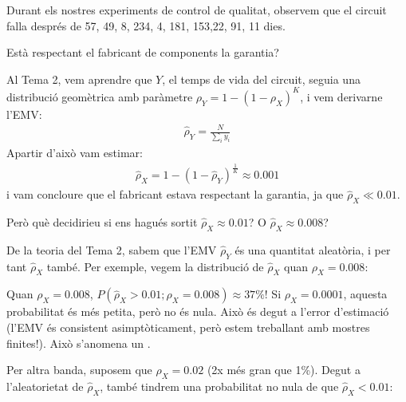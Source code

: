 \documentclass[letterpaper,10pt,english]{sphinxmanual}
\let\sphinxpxdimen\pdfpxdimen\else\newdimen\sphinxpxdimen
\begin{document}
Durant els nostres experiments de control de qualitat, observem
que el circuit falla després  de 57, 49, 8, 234, 4, 181, 153,22,  91,  11 dies.

Està respectant el fabricant de components la garantia?

Al Tema 2, vem aprendre que \(Y\), el temps de vida del circuit,
seguia una distribució geomètrica amb paràmetre \(\rho_Y = 1 - (1-\rho_X)^K\),
i vem derivar\sphinxhyphen{}ne l’EMV:
\begin{equation*}
\begin{split}\hat{\rho}_Y = \frac{N}{\sum_i y_i}\end{split}
\end{equation*}
Apartir d’això vam estimar:
\begin{equation*}
\begin{split}\hat{\rho}_X = 1 - (1 - \hat{\rho}_Y)^\frac{1}{K} \approx 0.001\end{split}
\end{equation*}
i vam concloure que el fabricant estava respectant la garantia, ja que \(\hat{\rho}_X \ll 0.01\).

Però què decidirieu si ens hagués sortit \(\hat{\rho}_X \approx 0.01\)? O \(\hat{\rho}_X \approx 0.008\)?

De la teoria del Tema 2, sabem que l’EMV \(\hat{\rho}_Y\) és
una quantitat aleatòria, i per tant \(\hat{\rho}_X\) també. Per
exemple, vegem la distribució de \(\hat{\rho}_X\) quan \(\rho_X=0.008\):

\noindent{\hspace*{\fill}\sphinxincludegraphics[height=250\sphinxpxdimen]{{geom_null}.png}\hspace*{\fill}}

Quan \(\rho_X = 0.008\), \(P(\hat{\rho}_X > 0.01; \rho_X = 0.008) \approx 37\%\)! Si
\(\rho_X = 0.0001\), aquesta probabilitat és més petita, però no és nula. Això és
degut a l’error d’estimació (l’EMV és consistent asimptòticament, però estem treballant amb mostres finites!).
Això s’anomena un .

Per altra banda, suposem que \(\rho_X = 0.02\) (2x més gran que 1\%).
Degut a l’aleatorietat de \(\hat{\rho}_X\), també
tindrem una probabilitat no nula de que \(\hat{\rho}_X < 0.01\):

\noindent{\hspace*{\fill}\sphinxincludegraphics[height=250\sphinxpxdimen]{{geom_H1}.png}\hspace*{\fill}}
\end{document}
